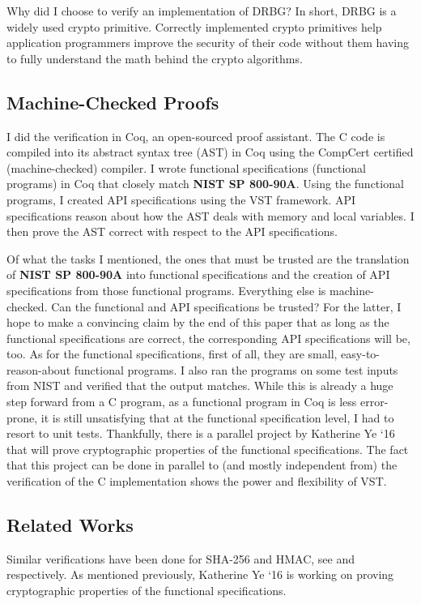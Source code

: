\documentclass[pageno]{jpaper}
\newcommand{\stdtitle}[1]{\textbf{#1}}
\begin{document}
Why did I choose to verify an implementation of DRBG? In short, DRBG is a widely used crypto primitive. Correctly implemented crypto primitives help application programmers improve the security of their code without them having to fully understand the math behind the crypto algorithms.

\subsection{Machine-Checked Proofs}
I did the verification in Coq, an open-sourced proof assistant. The C code is compiled into its abstract syntax tree (AST) in Coq using the CompCert certified (machine-checked) compiler. I wrote functional specifications (functional programs) in Coq that closely match \stdtitle{NIST SP 800-90A}. Using the functional programs, I created API specifications using the VST framework. API specifications reason about how the AST deals with memory and local variables. I then prove the AST correct with respect to the API specifications.

Of what the tasks I mentioned, the ones that must be trusted are the translation of \stdtitle{NIST SP 800-90A} into functional specifications and the creation of API specifications from those functional programs. Everything else is machine-checked. Can the functional and API specifications be trusted? For the latter, I hope to make a convincing claim by the end of this paper that as long as the functional specifications are correct, the corresponding API specifications will be, too. As for the functional specifications, first of all, they are small, easy-to-reason-about functional programs. I also ran the programs on some test inputs from NIST and verified that the output matches. While this is already a huge step forward from a C program, as a functional program in Coq is less error-prone, it is still unsatisfying that at the functional specification level, I had to resort to unit tests. Thankfully, there is a parallel project by Katherine Ye ‘16 that will prove cryptographic properties of the functional specifications. The fact that this project can be done in parallel to (and mostly independent from) the verification of the C implementation shows the power and flexibility of VST.

\subsection{Related Works}
Similar verifications have been done for SHA-256 and HMAC, see \cite{sha} and \cite{hmac} respectively. As mentioned previously, Katherine Ye ‘16 is working on proving cryptographic properties of the functional specifications.
\end{document}
